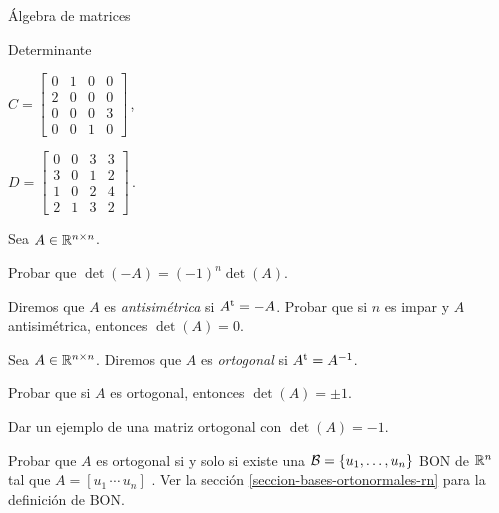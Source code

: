 \begin{chapter}{\'Algebra de matrices}
\begin{section}{Determinante}
\begin{enumex}
\begin{enumex}
        \begin{minipage}{0.4\textwidth}
            \item $C=\begin{bmatrix}
                0&1&0&0\\2&0&0&0\\0&0&0&3\\0&0&1&0
            \end{bmatrix}$\,,
        \end{minipage}
        \begin{minipage}{0.4\textwidth}
            \item $D=\begin{bmatrix}
                0&0&3&3\\3&0&1&2\\1&0&2&4\\2&1&3&2
            \end{bmatrix}$\,.
        \end{minipage}
        \end{enumex}
    \item  Sea $A \in \mathbb R^{n \times n}$.
    \begin{enumex}
        \item Probar que $\det(-A) = (-1)^n \det(A)$. 
        \item Diremos que $A$  es \textit{antisimétrica} si $A^{\operatorname{t}} = -A$. Probar que si $n$  es impar y $A$ antisimétrica,  entonces $\det(A) =0$.
    \end{enumex}   
    \item  Sea $A \in \mathbb R^{n \times n}$. Diremos que $A$  es \textit{ortogonal} si $A^{\operatorname{t}} = A^{-1}$.
    \begin{enumex}
        \item Probar que si $A$ es ortogonal, entonces $\det(A) = \pm 1$. 
        \item Dar un ejemplo de una matriz ortogonal con $\det(A) = -1$. 
        \item Probar que $A$ es ortogonal si y solo si  existe una $\mathcal{B} = \{u_1,\ldots,u_n\}$ BON de $\mathbb R^n$ tal que $A = [u_1 \, \cdots \, u_n]$ . Ver la sección  \ref{seccion-bases-ortonormales-rn} para la definición de BON.
    \end{enumex}   


\end{enumex}
\end{section}
\end{chapter}
